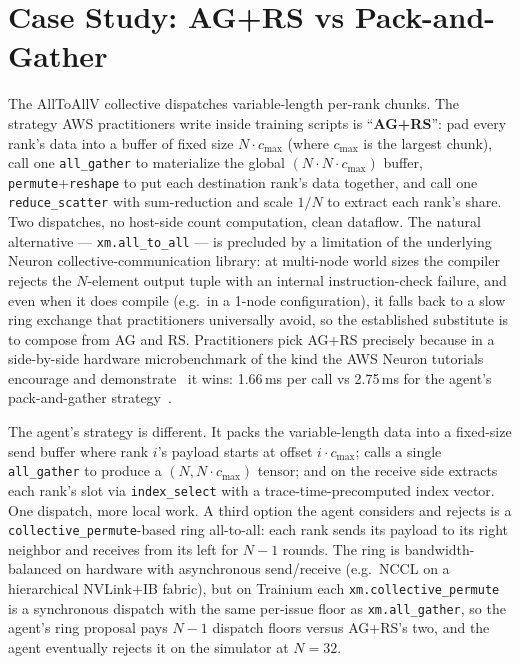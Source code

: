 \section{Case Study: AG+RS vs Pack-and-Gather}
\label{sec:agrs}

The AllToAllV collective dispatches variable-length per-rank chunks.
The strategy AWS practitioners write inside training scripts is
``\textbf{AG+RS}'': pad every rank's data into a buffer of fixed
size $N \cdot c_{\max}$ (where $c_{\max}$ is the largest chunk),
call one \texttt{all\_gather} to materialize the global $(N \cdot N
\cdot c_{\max})$ buffer, \texttt{permute}+\texttt{reshape} to put
each destination rank's data together, and call one
\texttt{reduce\_scatter} with sum-reduction and scale $1/N$ to
extract each rank's share. Two dispatches, no host-side count
computation, clean dataflow. The natural alternative ---
\texttt{xm.all\_to\_all} --- is precluded by a limitation of the
underlying Neuron collective-communication library: at multi-node
world sizes the compiler rejects the $N$-element output tuple with
an internal instruction-check failure, and even when it does compile
(e.g.\ in a 1-node configuration), it falls back to a slow ring
exchange that practitioners universally avoid, so the established
substitute is to compose from AG and RS. Practitioners pick
AG+RS precisely because in a side-by-side hardware microbenchmark
of the kind the AWS Neuron tutorials encourage and
demonstrate~\cite{aws_neuron_tutorials} it wins:
1.66\,ms per call vs 2.75\,ms for the agent's pack-and-gather
strategy~\cite{aws_neuron_tutorials}.

The agent's strategy is different. It packs the variable-length
data into a fixed-size send buffer where rank $i$'s payload starts at
offset $i \cdot c_{\max}$; calls a single \texttt{all\_gather} to
produce a $(N, N \cdot c_{\max})$ tensor; and on the receive side
extracts each rank's slot via \texttt{index\_select} with a
trace-time-precomputed index vector. One dispatch, more local work.
A third option the agent considers and rejects is a
\texttt{collective\_permute}-based ring all-to-all: each rank sends
its payload to its right neighbor and receives from its left for
$N{-}1$ rounds. The ring is bandwidth-balanced on hardware with
asynchronous send/receive (e.g.\ NCCL on a hierarchical
NVLink$+$IB fabric), but on Trainium each
\texttt{xm.collective\_permute} is a synchronous dispatch with the
same per-issue floor as \texttt{xm.all\_gather}, so the agent's
ring proposal pays $N{-}1$ dispatch floors versus AG+RS's two,
and the agent eventually rejects it on the simulator at $N{=}32$.

